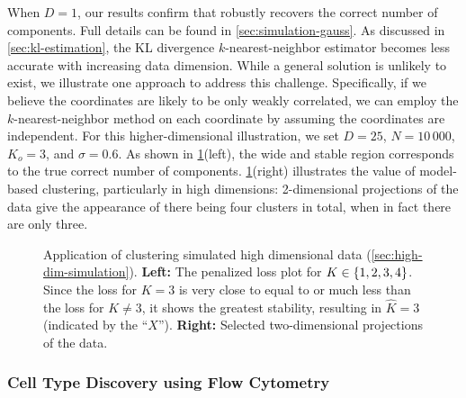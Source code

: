 When $D = 1$, our results confirm that \methodname robustly recovers the correct number of components.
Full details can be found in \cref{sec:simulation-gauss}.
As discussed in \cref{sec:kl-estimation}, the KL divergence $k$-nearest-neighbor estimator becomes less accurate with increasing data dimension.
While a general solution is unlikely to exist, we illustrate one approach to address this challenge.
Specifically, if we believe the coordinates are likely to be only weakly correlated, we can employ the $k$-nearest-neighbor
method on each coordinate by assuming the coordinates are independent.
For this higher-dimensional illustration, we set $D = 25$, $N=10\,000$, $K_{o}=3$, and $\sigma=0.6$.
As shown in \cref{fig:high-dim}(left), the wide and stable region corresponds to the true correct number of components.
\cref{fig:high-dim}(right) illustrates the value of model-based clustering, particularly in high dimensions: 2-dimensional
projections of the data give the appearance of there being four clusters in total, when in fact there are only three.

\begin{figure}[tp]
	\centering
	\subfloat{\label{fig:high-dim-stare-loss}\texttt{[image: multiGMM-penloss-rho-n=10000-d=50-legend]}}
	\subfloat{\label{fig:high-dim-true}\texttt{[image: selected-cluster-plot-comparison-K=3]}}

	\caption{Application of \methodname clustering simulated high dimensional data (\cref{sec:high-dim-simulation}).
		\textbf{Left:} The penalized loss plot for $K \in \{1,2,3,4\}$.
		Since the loss for $K=3$ is very close to equal to or much less than the loss for $K \ne 3$, it shows the greatest
		stability, resulting in $\widehat K = 3$ (indicated by the ``$X$'').
		\textbf{Right:} Selected two-dimensional projections of the data.}
	\label{fig:high-dim}
\end{figure}





\subsubsection{Cell Type Discovery using Flow Cytometry}
\label{sec:flow-cytometry}

